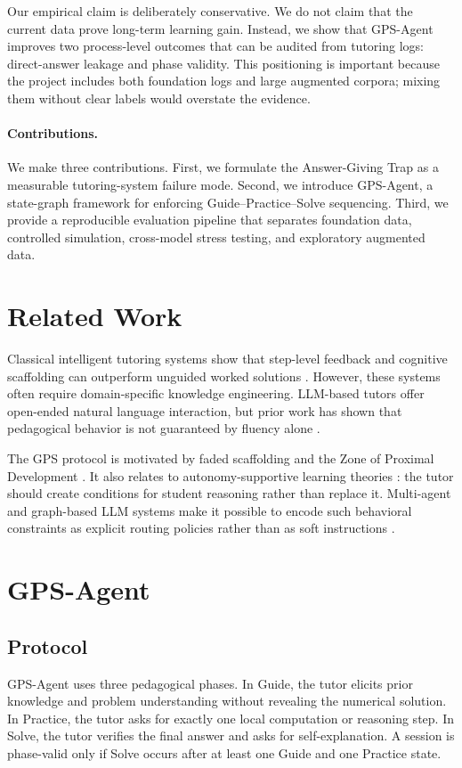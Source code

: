 \documentclass[11pt]{article}
\begin{document}
Our empirical claim is deliberately conservative. We do not claim that the current data prove long-term learning gain. Instead, we show that GPS-Agent improves two process-level outcomes that can be audited from tutoring logs: direct-answer leakage and phase validity. This positioning is important because the project includes both foundation logs and large augmented corpora; mixing them without clear labels would overstate the evidence.

\paragraph{Contributions.} We make three contributions. First, we formulate the Answer-Giving Trap as a measurable tutoring-system failure mode. Second, we introduce GPS-Agent, a state-graph framework for enforcing Guide--Practice--Solve sequencing. Third, we provide a reproducible evaluation pipeline that separates foundation data, controlled simulation, cross-model stress testing, and exploratory augmented data.

\section{Related Work}
Classical intelligent tutoring systems show that step-level feedback and cognitive scaffolding can outperform unguided worked solutions \citep{vanlehn2011relative,koedinger2006cognitive}. However, these systems often require domain-specific knowledge engineering. LLM-based tutors offer open-ended natural language interaction, but prior work has shown that pedagogical behavior is not guaranteed by fluency alone \citep{tack2022teacher,macina2023mathdial}.

The GPS protocol is motivated by faded scaffolding \citep{wood1976role} and the Zone of Proximal Development \citep{vygotsky1978mind}. It also relates to autonomy-supportive learning theories \citep{ryan2000self}: the tutor should create conditions for student reasoning rather than replace it. Multi-agent and graph-based LLM systems make it possible to encode such behavioral constraints as explicit routing policies rather than as soft instructions \citep{wu2023autogen}.

\section{GPS-Agent}
\subsection{Protocol}
GPS-Agent uses three pedagogical phases. In Guide, the tutor elicits prior knowledge and problem understanding without revealing the numerical solution. In Practice, the tutor asks for exactly one local computation or reasoning step. In Solve, the tutor verifies the final answer and asks for self-explanation. A session is phase-valid only if Solve occurs after at least one Guide and one Practice state.
\end{document}

